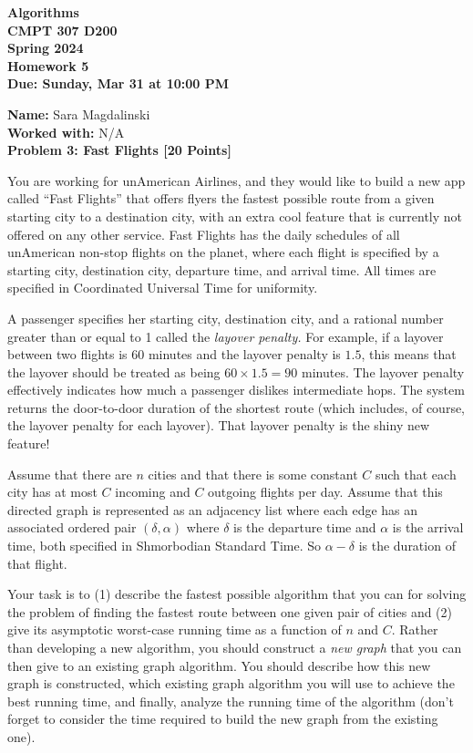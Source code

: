 \documentclass[12pt]{article}
\newcommand{\Name}[1]{\noindent \textbf{Name:} #1 \\}
\newcommand{\Workedwith}[1]{\noindent \textbf{Worked with:} #1 \\}
\newcommand{\Problem}[3]{\mbox{} \newline \noindent \textbf{\textbf{Problem #1: #2 [#3 Points] \\ }}}
\begin{document}
\begin{center}
  \bf
  Algorithms \\
  CMPT 307 D200 \\
  Spring 2024 \\
  \rm
  Homework 5\\
  Due:  Sunday, Mar 31 at 10:00 PM \\
\end{center}

\Name{Sara Magdalinski}
\Workedwith{N/A}

\Problem{3}{Fast Flights}{20}

You are working for unAmerican Airlines, and they would like to build a new app called ``Fast Flights'' that offers flyers the fastest possible route from a given starting city to a destination city, with an extra cool feature that is currently not offered on any other service. Fast Flights has the daily schedules of all unAmerican non-stop flights on the planet, where each flight is specified by a starting city, destination city, departure time, and arrival time.  All times are specified in Coordinated Universal Time for uniformity.

A passenger specifies her starting city, destination city, and a rational number greater than or equal to 1 called the \emph{layover penalty.}  For example, if a layover between two flights is 60 minutes and the layover penalty is $1.5$, this means that the layover should be treated as being $60 \times 1.5 = 90$ minutes.  The layover penalty effectively indicates how much a passenger dislikes intermediate hops.  The system returns the door-to-door duration of the shortest route (which includes, of course, the layover penalty for each layover).  That layover penalty is the shiny new feature!

Assume that there are $n$ cities and that there is some constant $C$ such that each city has at most $C$ incoming and $C$ outgoing flights per day.  Assume that this directed graph is represented as an adjacency list where each edge has an associated ordered pair $(\delta, \alpha)$ where $\delta$ is the departure time and $\alpha$ is the arrival time, both specified in Shmorbodian Standard Time.  So $\alpha - \delta$ is the duration of that flight.

Your task is to (1) describe the fastest possible algorithm that you can for solving the problem of finding the fastest route between one given pair of cities and (2) give its asymptotic worst-case running time as a function of $n$ and $C$.  Rather than developing a new algorithm, you should construct a \emph{new graph} that you can then give to an existing graph algorithm.
You should describe how this new graph is constructed, which existing graph algorithm you will use to achieve the best running time, and finally, analyze the running time of the algorithm (don't forget to consider the time required to build the new graph from the existing one).
\end{document}
